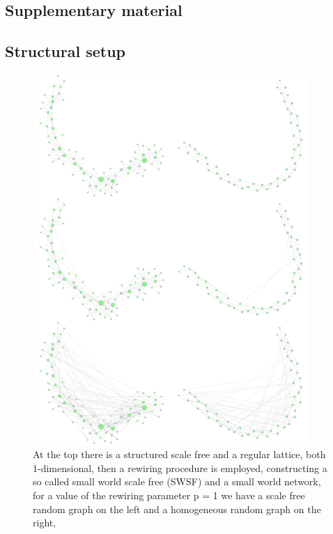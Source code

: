 \clearpage
{} %

\begin{appendices}

\chapter{Supplementary material}

\section{Structural setup}
\label{app:ciso}
\begin{figure}[htbp]
  \centering
  \includegraphics[width=10.5cm,keepaspectratio]{images/SWSF_Vs_SW.jpg}
  \caption{At the top there is a structured scale free and a regular lattice, both 1-dimensional, then a rewiring procedure is employed, constructing a so called small world scale free (SWSF) and a small world network, for a value of the rewiring parameter p = 1 we have a scale free random graph on the left and a homogeneous random graph on the right, }
  \label{fig:yourlabel}
\end{figure}


\end{appendices}
